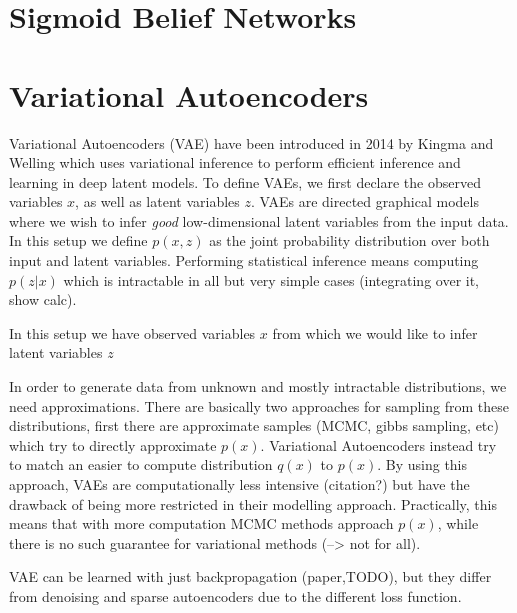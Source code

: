 \documentclass[twoside,11pt,a4paper]{article}
\theoremstyle{break}
\begin{document}
\section{Sigmoid Belief Networks}
\label{sec:sbn}


\section{Variational Autoencoders}
\label{sec:vae}
Variational Autoencoders (VAE) have been introduced in 2014 by Kingma and Welling which uses variational inference to perform efficient inference and learning in deep latent models.
To define VAEs, we first declare the observed variables $x$, as well as latent variables $z$.
VAEs are directed graphical models where we wish to infer \emph{good} low-dimensional latent variables from the input data.
In this setup we define $p(x,z)$ as the joint probability distribution over both input and latent variables.
Performing statistical inference means computing $p(z|x)$ which is intractable in all but very simple cases (integrating over it, show calc).
 
In this setup we have observed variables $x$ from which we would like to infer latent variables $z$


In order to generate data from unknown and mostly intractable distributions, we need approximations.
There are basically two approaches for sampling from these distributions,
first there are approximate samples (MCMC, gibbs sampling, etc) which try to directly approximate $p(x)$.
Variational Autoencoders instead try to match an easier to compute distribution $q(x)$ to $p(x)$.
By using this approach, VAEs are computationally less intensive (citation?) but have the drawback of being more restricted in their modelling approach.
Practically, this means that with more computation MCMC methods approach $p(x)$, while there is no such guarantee for variational methods (--> not for all).

VAE can be learned with just backpropagation (paper,TODO), but they differ from denoising and sparse autoencoders due to the different loss function.


\end{document}
